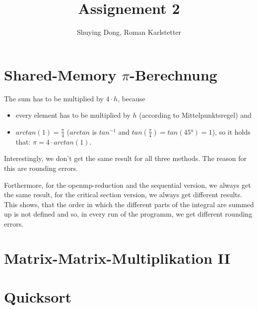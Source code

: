 \documentclass[a4paper,10pt]{article}
\title{Assignement 2}
\author{Shuying Dong, Roman Karlstetter}
\begin{document}
\section{Shared-Memory $\pi$-Berechnung}
The sum has to be multiplied by $4\cdot h$, because
\begin{itemize}
 \item every element has to be multiplied by $h$ (according to Mittelpunktsregel) and
 \item $arctan(1) = \frac{\pi}{4}$ ($arctan$ is $tan^{-1}$ and $tan(\frac{\pi}{4}) = tan(45°) = 1$), so it holds that: $\pi = 4 \cdot arctan(1)$. 
\end{itemize}

Interestingly, we don't get the same result for all three methods. The reason for this are rounding errors. 

Forthermore, for the openmp-reduction and the sequential version, we always get the same result, for the critical section version, we always get different results. This shows, that the order in which the different parts of the integral are summed up is not defined and so, in every run of the programm, we get different rounding errors.

\section{Matrix-Matrix-Multiplikation II}

\section{Quicksort}
\end{document}
